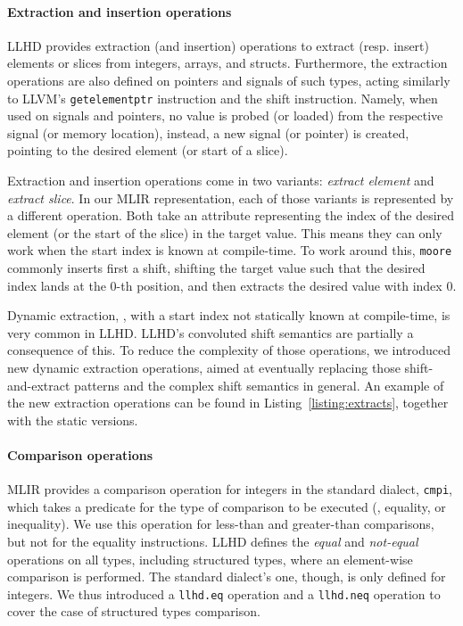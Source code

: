 \paragraph{Extraction and insertion operations}
LLHD provides extraction (and insertion) operations to extract (resp. insert) elements or slices from integers, arrays, and structs. Furthermore, the extraction operations are also defined on pointers and signals of such types, acting similarly to LLVM's \texttt{getelementptr} instruction and the shift instruction. Namely, when used on signals and pointers, no value is probed (or loaded) from the respective signal (or memory location), instead, a new signal (or pointer) is created, pointing to the desired element (or start of a slice).

Extraction and insertion operations come in two variants: \textit{extract element} and \textit{extract slice}. In our MLIR representation, each of those variants is represented by a different operation. Both take an attribute representing the index of the desired element (or the start of the slice) in the target value. This means they can only work when the start index is known at compile-time. To work around this, \texttt{moore} commonly inserts first a shift, shifting the target value such that the desired index lands at the $0$-th position, and then extracts the desired value with index $0$.

Dynamic extraction, \ie, with a start index not statically known at compile-time, is very common in LLHD. LLHD's convoluted shift semantics are partially a consequence of this. To reduce the complexity of those operations, we introduced new dynamic extraction operations, aimed at eventually replacing those shift-and-extract patterns and the complex shift semantics in general. An example of the new extraction operations can be found in Listing~\ref{listing:extracts}, together with the static versions.


\paragraph{Comparison operations}
MLIR provides a comparison operation for integers in the standard dialect, \texttt{cmpi}, which takes a predicate for the type of comparison to be executed (\eg, equality, or inequality). We use this operation for less-than and greater-than comparisons, but not for the equality instructions. LLHD defines the \textit{equal} and \textit{not-equal} operations on all types, including structured types, where an element-wise comparison is performed. The standard dialect's one, though, is only defined for integers. We thus introduced a \texttt{llhd.eq} operation and a \texttt{llhd.neq} operation to cover the case of structured types comparison.
